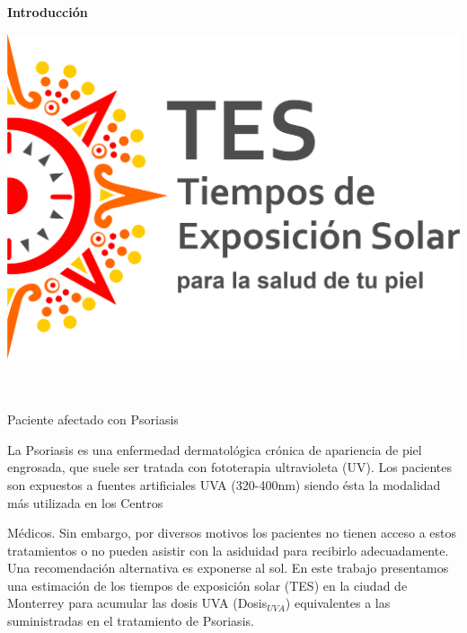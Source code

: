\documentclass{article}
\begin{document}
\begin{multicols}{2}
\changefontsizes{13pt}
\begin{center}
\begin{shaded}
\textbf{\textcolor{na}{Introducción}}
\end{shaded}
\end{center}
\begin{minipage}{0.4\linewidth}
\includegraphics[scale=0.35]{images/TES.png}
\vspace{-0.6cm}\\
\changefontsizes{0.5pt}
\textcolor{white}{Cortesía:Centro \\Dermatológico Pascua}
\begin{center}
\changefontsizes{10pt}
\vspace{0.6cm}
\textcolor{na}{Paciente afectado con Psoriasis}
\end{center}
\end{minipage}
\hspace{-0.cm}
\begin{minipage}{0.6\linewidth}
La Psoriasis es una enfermedad dermatológica crónica de apariencia de piel engrosada, que suele ser tratada con fototerapia ultravioleta (UV). Los pacientes son expuestos a fuentes artificiales UVA (320-400nm) siendo ésta la modalidad más utilizada en los Centros
\end{minipage}
 Médicos. Sin embargo, por diversos motivos los pacientes no tienen acceso a estos tratamientos o no pueden asistir con la asiduidad para recibirlo adecuadamente. Una recomendación alternativa es exponerse al sol. En este trabajo presentamos una  estimación de los tiempos de  exposición solar (TES)  en la ciudad de Monterrey para acumular las dosis UVA (Dosis$_{UVA}$) equivalentes a las suministradas en el tratamiento de Psoriasis.

\end{multicols}
\end{document}
